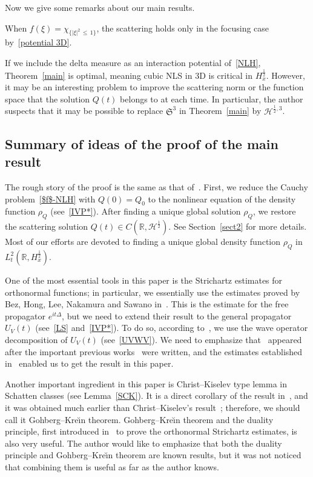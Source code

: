 \documentclass[10pt,a4paper]{amsart}
\newcommand{\BR}{\mathbb{R}}
\newcommand{\CH}{\mathcal{H}}
\newcommand{\FS}{\mathfrak{S}}
\newcommand{\rh}{\rho}
\newcommand{\ch}{\chi}
\newcommand{\De}{\Delta}
\newcommand{\R}{\mathbb{R}}
\newcommand{\tw}{\frac{1}{2}}
\begin{document}
Now we give some remarks about our main results.

\begin{rema}
When $f(\xi) = \ch_{\{|\xi|^2\,\le\,1\}}$, the scattering holds only in the focusing case by~\eqref{potential 3D}.
\end{rema}

\begin{rema}
If we include the delta measure as an interaction potential of~\eqref{NLH}, Theorem~\ref{main} is optimal, meaning cubic NLS in 3D is critical in $H^\tw_x$. However, it may be an interesting problem to improve the scattering norm or the function space that the solution $Q(t)$ belongs to at each time. In particular, the author suspects that it may be possible to replace $\FS^3$ in Theorem~\ref{main} by $\CH^{\tw,3}$.
\end{rema}



\subsection{Summary of ideas of the proof of the main result} 

The rough story of the proof is the same as that of~\cite{2018CHP,2014LS}. First, we reduce the Cauchy problem~\eqref{$f$-NLH} with $Q(0)=Q_0$ to the nonlinear equation of the density function $\rh_Q$ (see~\eqref{IVP*}). After finding a unique global solution $\rh_Q$, we restore the scattering solution $Q(t) \in C(\BR,\CH^\tw)$. See Section~\ref{sect2} for more details. Most of our efforts are devoted to finding a unique global density function $\rh_Q$ in $L^2_t(\R,H^\tw_x)$.

One of the most essential tools in this paper is the Strichartz estimates for orthonormal functions; in particular, we essentially use the estimates proved by Bez, Hong, Lee, Nakamura and Sawano in~\cite{2019BHLNS}. This is the estimate for the free propagator $e^{it\De}$, but we need to extend their result to the general propagator $U_V(t)$ (see~\eqref{LS} and~\eqref{IVP*}). To do so, according to~\cite{2018CHP,2014LS}, we use the wave operator decomposition of $U_V(t)$ (see~\eqref{UVWV}). We need to emphasize that~\cite{2019BHLNS} appeared after the important previous works~\cite{2018CHP,2014LS} were written, and the estimates established in~\cite{2019BHLNS} enabled us to get the result in this paper.

Another important ingredient in this paper is Christ--Kiselev type lemma in Schatten classes (see Lemma~\ref{SCK}). It is a direct corollary of the result in~\cite{1970Go-Kre}, and it was obtained much earlier than Christ--Kiselev's result~\cite{2001CK}; therefore, we should call it Gohberg--Kre\u{\i}n theorem. Gohberg--Kre\u{\i}n theorem and the duality principle, first introduced in~\cite{2017FS} to prove the orthonormal Strichartz estimates, is also very useful. The author would like to emphasize that both the duality principle and Gohberg--Kre\u{\i}n theorem are known results, but it was not noticed that combining them is useful as far as the author knows.
\end{document}
